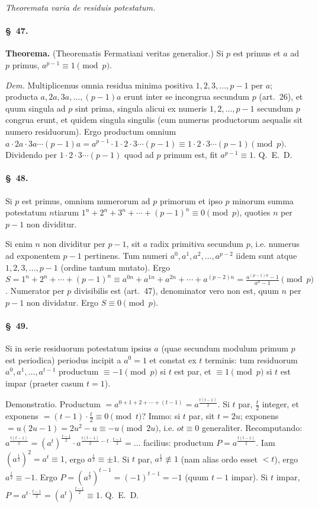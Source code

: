 \documentclass[12pt,a4paper]{article}
\theoremstyle{plain}
\theoremstyle{definition}
\theoremstyle{remark}
\newcommand{\art}[1]{\paragraph{\S\ #1.}}
\begin{document}
\begin{center}
\textit{Theoremata varia de residuis potestatum.}
\end{center}

\art{47}
\textbf{Theorema.} (Theorematis Fermatiani veritas generalior.) Si $p$ est primus et $a$ ad $p$ primus, $a^{p-1} \equiv 1 \pmod{p}$.

\emph{Dem.} Multiplicemus omnia residua minima positiva $1, 2, 3, \ldots, p-1$ per $a$; producta $a, 2a, 3a, \ldots, (p-1)a$ erunt inter se incongrua secundum $p$ (art.~26), et quum singula ad $p$ sint prima, singula alicui ex numeris $1, 2, \ldots, p-1$ secundum $p$ congrua erunt, et quidem singula singulis (cum numerus productorum aequalis sit numero residuorum). Ergo productum omnium $a \cdot 2a \cdot 3a \cdots (p-1)a = a^{p-1} \cdot 1 \cdot 2 \cdot 3 \cdots (p-1) \equiv 1 \cdot 2 \cdot 3 \cdots (p-1) \pmod{p}$. Dividendo per $1 \cdot 2 \cdot 3 \cdots (p-1)$ quod ad $p$ primum est, fit $a^{p-1} \equiv 1$. \hfill Q.~E.~D.

\art{48}
Si $p$ est primus, omnium numerorum ad $p$ primorum et ipso $p$ minorum summa potestatum $n$tiarum $1^n + 2^n + 3^n + \cdots + (p-1)^n \equiv 0 \pmod{p}$, quoties $n$ per $p-1$ non dividitur.

Si enim $n$ non dividitur per $p-1$, sit $a$ radix primitiva secundum $p$, i.e. numerus ad exponentem $p-1$ pertinens. Tum numeri $a^0, a^1, a^2, \ldots, a^{p-2}$ iidem sunt atque $1, 2, 3, \ldots, p-1$ (ordine tantum mutato). Ergo $S = 1^n + 2^n + \cdots + (p-1)^n \equiv a^{0n} + a^{1n} + a^{2n} + \cdots + a^{(p-2)n} = \frac{a^{(p-1)n} - 1}{a^n - 1} \pmod{p}$. Numerator per $p$ divisibilis est (art.~47), denominator vero non est, quum $n$ per $p-1$ non dividatur. Ergo $S \equiv 0 \pmod{p}$.

\art{49}
Si in serie residuorum potestatum ipsius $a$ (quae secundum modulum primum $p$ est periodica) periodus incipit a $a^0 = 1$ et constat ex $t$ terminis: tum residuorum $a^0, a^1, \ldots, a^{t-1}$ productum $\equiv -1 \pmod{p}$ si $t$ est par, et $\equiv 1 \pmod{p}$ si $t$ est impar (praeter casum $t = 1$).

Demonstratio. Productum $= a^{0+1+2+\cdots+(t-1)} = a^{\frac{t(t-1)}{2}}$. Si $t$ par, $\frac{t}{2}$ integer, et exponens $= (t-1) \cdot \frac{t}{2} \equiv 0 \pmod{t}$? Immo: si $t$ par, sit $t = 2u$; exponens $= u(2u-1) = 2u^2 - u \equiv -u \pmod{2u}$, i.e. $
ot\equiv 0$ generaliter. Recomputando: $a^{\frac{t(t-1)}{2}} = (a^t)^{\frac{t-1}{2}} \cdot a^{\frac{t(t-1)}{2} - t \cdot \frac{t-1}{2}} = \ldots$ facilius: productum $P = a^{\frac{t(t-1)}{2}}$. Iam $(a^{\frac{t}{2}})^2 = a^t \equiv 1$, ergo $a^{\frac{t}{2}} \equiv \pm 1$. Si $t$ par, $a^{\frac{t}{2}} \not\equiv 1$ (nam alias ordo esset $< t$), ergo $a^{\frac{t}{2}} \equiv -1$. Ergo $P = (a^{\frac{t}{2}})^{t-1} = (-1)^{t-1} = -1$ (quum $t-1$ impar). Si $t$ impar, $P = a^{t \cdot \frac{t-1}{2}} = (a^t)^{\frac{t-1}{2}} \equiv 1$. \hfill Q.~E.~D.
\end{document}
